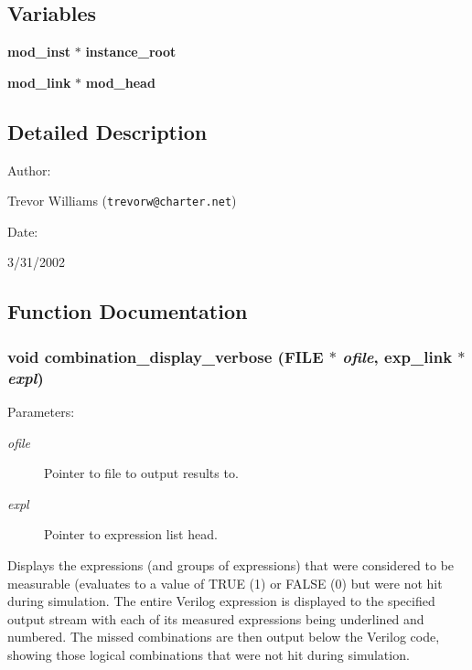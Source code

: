 \subsection*{Variables}
\begin{CompactItemize}
\item 
{\bf mod\_\-inst} $\ast$ {\bf instance\_\-root}
\item 
{\bf mod\_\-link} $\ast$ {\bf mod\_\-head}
\end{CompactItemize}


\subsection{Detailed Description}


\begin{Desc}
\item[Author: ]\par
Trevor Williams ({\tt trevorw@charter.net}) \end{Desc}
\begin{Desc}
\item[Date: ]\par
3/31/2002\end{Desc}


\subsection{Function Documentation}
\subsubsection{\setlength{\rightskip}{0pt plus 5cm}void combination\_\-display\_\-verbose (FILE $\ast$ {\em ofile}, {\bf exp\_\-link} $\ast$ {\em expl})}\label{comb_8c_a8}


\begin{Desc}
\item[Parameters: ]\par
\begin{description}
\item[{\em 
ofile}]Pointer to file to output results to. \item[{\em 
expl}]Pointer to expression list head.\end{description}
\end{Desc}
Displays the expressions (and groups of expressions) that were considered  to be measurable (evaluates to a value of TRUE (1) or FALSE (0) but were  not hit during simulation. The entire Verilog expression is displayed to the specified output stream with each of its measured expressions being underlined and numbered. The missed combinations are then output below the Verilog code, showing those logical combinations that were not hit during simulation. 
